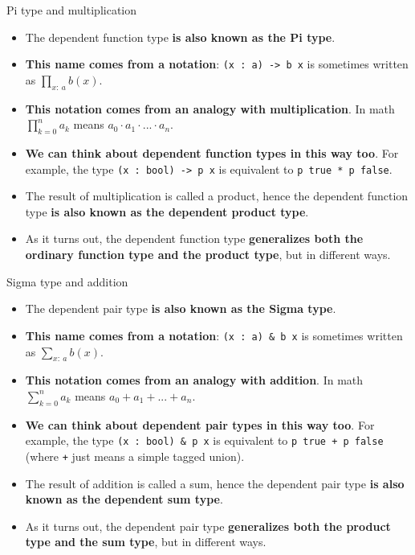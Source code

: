 \documentclass{beamer}
\newcommand{\m}[1]{\texttt{#1}}
\begin{document}
\begin{frame}{Pi type and multiplication}
\begin{itemize}
	\item The dependent function type \textbf{is also known as the Pi type}.
	\item \textbf{This name comes from a notation}: \m{(x :\ a) -> b x} is sometimes written as $\displaystyle \prod_{x :\ a} b(x)$.
	\item \textbf{This notation comes from an analogy with multiplication}. In math $\displaystyle \prod_{k = 0}^n a_k$ means $a_0 \cdot a_1 \cdot ... \cdot a_n$.
	\item \textbf{We can think about dependent function types in this way too}. For example, the type \m{(x :\ bool) -> p x} is equivalent to \m{p true * p false}.
	\item The result of multiplication is called a product, hence the dependent function type \textbf{is also known as the dependent product type}.
	\item As it turns out, the dependent function type \textbf{generalizes both the ordinary function type and the product type}, but in different ways.
\end{itemize}
\end{frame}

\begin{frame}{Sigma type and addition}
\begin{itemize}
	\item The dependent pair type \textbf{is also known as the Sigma type}.
	\item \textbf{This name comes from a notation}: \m{(x :\ a) \& b x} is sometimes written as $\displaystyle \sum_{x :\ a} b(x)$.
	\item \textbf{This notation comes from an analogy with addition}. In math $\displaystyle \sum_{k = 0}^n a_k$ means $a_0 + a_1 + ... + a_n$.
	\item \textbf{We can think about dependent pair types in this way too}. For example, the type \m{(x :\ bool) \& p x} is equivalent to \m{p true + p false} (where \m{+} just means a simple tagged union).
	\item The result of addition is called a sum, hence the dependent pair type \textbf{is also known as the dependent sum type}.
	\item As it turns out, the dependent pair type \textbf{generalizes both the product type and the sum type}, but in different ways.
\end{itemize}
\end{frame}
\end{document}

